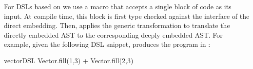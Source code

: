For DSLs based on \tool we use a macro that accepts a single block of
code as its input. At compile time, this block is first type checked
against the interface of the direct embedding. Then, \tool applies the
generic transformation to translate the directly embedded AST to the
corresponding deeply embedded AST.  For example, given the following
DSL snippet, \tool produces the  program in
:\vspace{3pt}
\begin{listingtiny}
  vectorDSL {
    Vector.fill(1,3) + Vector.fill(2,3)
  }
\end{listingtiny}

